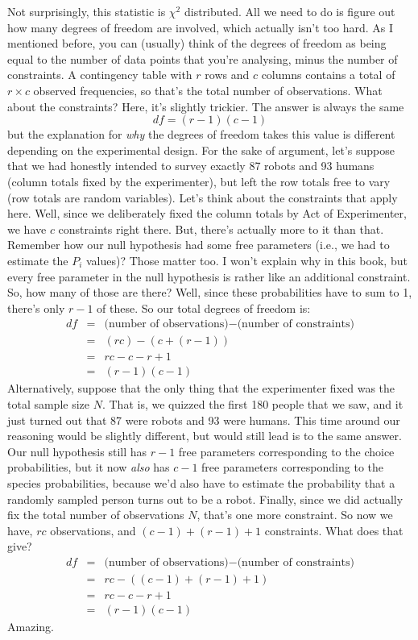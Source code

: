 Not surprisingly, this statistic is $\chi^2$ distributed. All we need to do is figure out how many degrees of freedom are involved, which actually isn't too hard. As I mentioned before, you can (usually) think of the degrees of freedom as being equal to the number of data points that you're analysing, minus the number of constraints. A contingency table with $r$ rows and $c$ columns contains a total of $r \times c$ observed frequencies, so that's the total number of observations. What about the constraints? Here, it's slightly trickier. The answer is always the same
$$
df = (r-1)(c-1)
$$
but the explanation for {\it why} the degrees of freedom takes this value is different depending on the experimental design. For the sake of argument, let's suppose that we had honestly intended to survey exactly 87 robots and 93 humans (column totals fixed by the experimenter), but left the row totals free to vary (row totals are random variables). Let's think about the constraints that apply here. Well, since we deliberately fixed the column totals by Act of Experimenter, we have $c$ constraints right there. But, there's actually more to it than that. Remember how our null hypothesis had some free parameters (i.e., we had to estimate the $P_i$ values)? Those matter too. I won't explain why in this book, but every free parameter in the null hypothesis is rather like an additional constraint. So, how many of those are there? Well, since these probabilities have to sum to 1, there's only $r-1$ of these. So our total degrees of freedom is:
$$
\begin{array}{rcl}
df &=& \mbox{(number of observations)} - \mbox{(number of constraints)} \\
&=& (rc) - (c + (r-1)) \\
&=& rc - c - r + 1 \\
&=& (r - 1)(c - 1)
\end{array}
$$
Alternatively, suppose that the only thing that the experimenter fixed was the total sample size $N$. That is, we quizzed the first 180 people that we saw, and it just turned out that 87 were robots and 93 were humans. This time around our reasoning would be slightly different, but would still lead is to the same answer. Our null hypothesis still has $r-1$ free parameters corresponding to the choice probabilities, but it now {\it also} has $c-1$ free parameters corresponding to the species probabilities, because we'd also have to estimate the probability that a randomly sampled person turns out to be a robot. Finally, since we did actually fix the total number of observations $N$, that's one more constraint. So now we have, $rc$ observations, and $(c-1) + (r-1) + 1$ constraints. What does that give?
$$
\begin{array}{rcl}
df &=& \mbox{(number of observations)} - \mbox{(number of constraints)} \\
&=& rc - ( (c-1) + (r-1) + 1) \\
&=& rc - c - r + 1 \\
&=& (r - 1)(c - 1)
\end{array}
$$
Amazing. 




